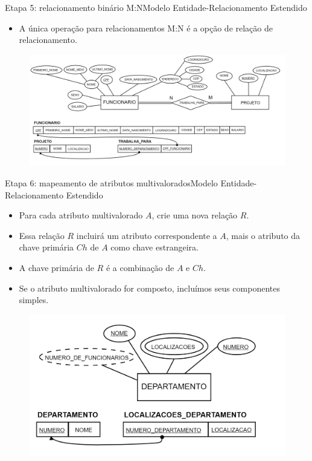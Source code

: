 \documentclass[t]{beamer}
\begin{document}

\begin{ftst}{Etapa 5: relacionamento binário M:N}{Modelo Entidade-Relacionamento Estendido}
\small
\begin{itemize}
    \item A única operação para relacionamentos M:N é a opção de relação de relacionamento.
\end{itemize}
\begin{figure}
    \centering
    \includegraphics[scale=0.12]{Figuras/03_10.png}
\end{figure}
\end{ftst}


\begin{ftst}{Etapa 6: mapeamento de atributos multivalorados}{Modelo Entidade-Relacionamento Estendido}
\begin{itemize}
    \item Para cada atributo multivalorado $A$, crie uma nova relação $R$.
    \item Essa relação $R$ incluirá um atributo correspondente a $A$, mais o atributo da chave primária $Ch$ de $A$ como chave estrangeira.
    \item A chave primária de $R$ é a combinação de $A$ e $Ch$.
    \item Se o atributo multivalorado for composto, incluímos seus componentes simples.
\end{itemize}
\begin{figure}
    \centering
    \includegraphics[scale=0.15]{Figuras/03_11.png}
\end{figure}

\end{ftst}
\end{document}
